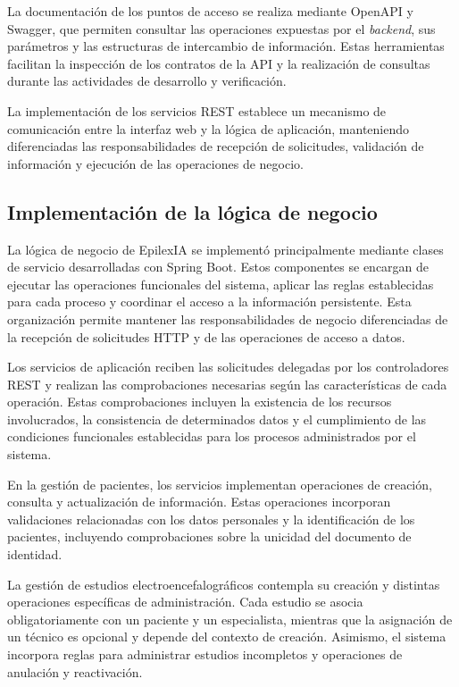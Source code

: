 La documentación de los puntos de acceso
se realiza mediante OpenAPI y Swagger,
que permiten consultar las operaciones
expuestas por el \textit{backend}, sus parámetros
y las estructuras de intercambio de
información. Estas herramientas facilitan
la inspección de los contratos de la API
y la realización de consultas durante
las actividades de desarrollo y verificación.

La implementación de los servicios REST
establece un mecanismo de comunicación
entre la interfaz web y la lógica de
aplicación, manteniendo diferenciadas
las responsabilidades de recepción de
solicitudes, validación de información
y ejecución de las operaciones de negocio.


\subsection{Implementación de la lógica de negocio}

La lógica de negocio de EpilexIA se implementó
principalmente mediante clases de servicio
desarrolladas con Spring Boot. Estos componentes
se encargan de ejecutar las operaciones
funcionales del sistema, aplicar las reglas
establecidas para cada proceso y coordinar
el acceso a la información persistente.
Esta organización permite mantener las
responsabilidades de negocio diferenciadas
de la recepción de solicitudes HTTP y de
las operaciones de acceso a datos.

Los servicios de aplicación reciben las
solicitudes delegadas por los controladores
REST y realizan las comprobaciones necesarias
según las características de cada operación.
Estas comprobaciones incluyen la existencia
de los recursos involucrados, la consistencia
de determinados datos y el cumplimiento
de las condiciones funcionales establecidas
para los procesos administrados por el sistema.

En la gestión de pacientes, los servicios
implementan operaciones de creación, consulta
y actualización de información. Estas
operaciones incorporan validaciones relacionadas
con los datos personales y la identificación
de los pacientes, incluyendo comprobaciones
sobre la unicidad del documento de identidad.

La gestión de estudios electroencefalográficos
contempla su creación y distintas operaciones
específicas de administración. Cada estudio
se asocia obligatoriamente con un paciente
y un especialista, mientras que la asignación
de un técnico es opcional y depende del
contexto de creación. Asimismo, el sistema
incorpora reglas para administrar estudios
incompletos y operaciones de anulación
y reactivación.

